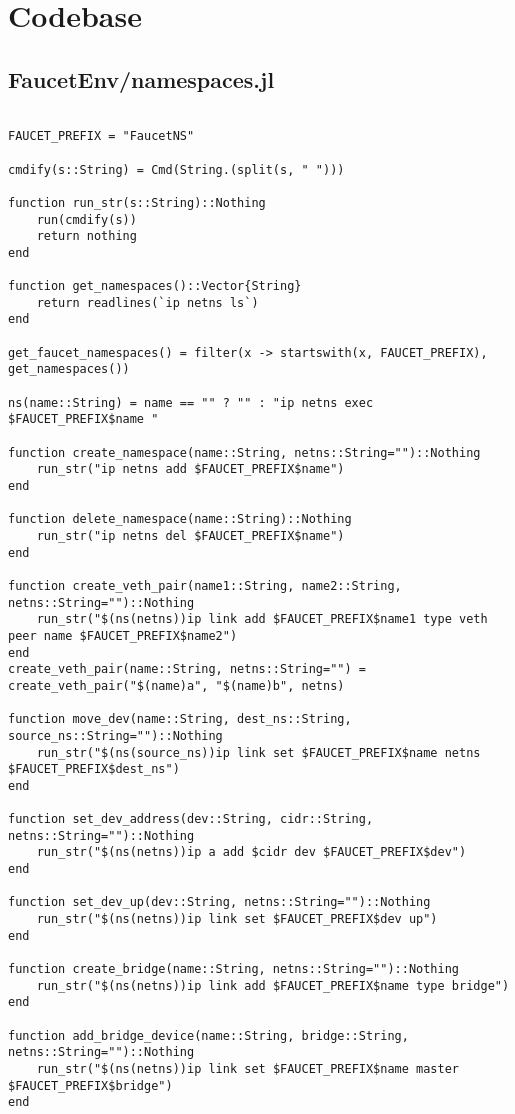 \chapter{Codebase}
\section{FaucetEnv/namespaces.jl}
\begin{lstlisting}[language=JuliaLocal, style=julia]

FAUCET_PREFIX = "FaucetNS"

cmdify(s::String) = Cmd(String.(split(s, " ")))

function run_str(s::String)::Nothing
    run(cmdify(s))
    return nothing
end

function get_namespaces()::Vector{String}
    return readlines(`ip netns ls`)
end

get_faucet_namespaces() = filter(x -> startswith(x, FAUCET_PREFIX), get_namespaces())

ns(name::String) = name == "" ? "" : "ip netns exec $FAUCET_PREFIX$name "

function create_namespace(name::String, netns::String="")::Nothing
    run_str("ip netns add $FAUCET_PREFIX$name")
end

function delete_namespace(name::String)::Nothing
    run_str("ip netns del $FAUCET_PREFIX$name")
end

function create_veth_pair(name1::String, name2::String, netns::String="")::Nothing
    run_str("$(ns(netns))ip link add $FAUCET_PREFIX$name1 type veth peer name $FAUCET_PREFIX$name2")
end
create_veth_pair(name::String, netns::String="") = create_veth_pair("$(name)a", "$(name)b", netns)

function move_dev(name::String, dest_ns::String, source_ns::String="")::Nothing
    run_str("$(ns(source_ns))ip link set $FAUCET_PREFIX$name netns $FAUCET_PREFIX$dest_ns")
end

function set_dev_address(dev::String, cidr::String, netns::String="")::Nothing
    run_str("$(ns(netns))ip a add $cidr dev $FAUCET_PREFIX$dev")
end

function set_dev_up(dev::String, netns::String="")::Nothing
    run_str("$(ns(netns))ip link set $FAUCET_PREFIX$dev up")
end

function create_bridge(name::String, netns::String="")::Nothing
    run_str("$(ns(netns))ip link add $FAUCET_PREFIX$name type bridge")
end

function add_bridge_device(name::String, bridge::String, netns::String="")::Nothing
    run_str("$(ns(netns))ip link set $FAUCET_PREFIX$name master $FAUCET_PREFIX$bridge")
end


\end{lstlisting}
